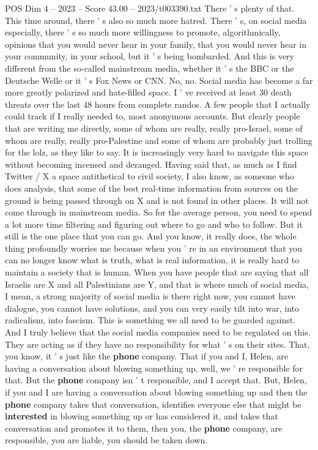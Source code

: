 \begin{textsample}{POS Dim 4 – 2023 – Score 43.00 – 2023/t003390.txt}
There ' s plenty of that.
This time around, there ' s also so much more hatred.
There ' s, on social media especially, there ' s so much more willingness to promote, algorithmically, opinions that you would never hear in your family, that you would never hear in your community, in your school, but it ' s being bombarded.
And this is very different from the so-called mainstream media, whether it ' s the BBC or the Deutsche Welle or it ' s Fox News or CNN.
No, no.
Social media has become a far more greatly polarized and hate-filled space.
I ' ve received at least 30 death threats over the last 48 hours from complete randos.
A few people that I actually could track if I really needed to, most anonymous accounts.
But clearly people that are writing me directly, some of whom are really, really pro-Israel, some of whom are really, really pro-Palestine and some of whom are probably just trolling for the lolz, as they like to say.
It is increasingly very hard to navigate this space without becoming incensed and deranged.
Having said that, as much as I find Twitter / X a space antithetical to civil society, I also know, as someone who does analysis, that some of the best real-time information from sources on the ground is being passed through on X and is not found in other places.
It will not come through in mainstream media.
So for the average person, you need to spend a lot more time filtering and figuring out where to go and who to follow.
But it still is the one place that you can go.
And you know, it really does, the whole thing profoundly worries me because when you ' re in an environment that you can no longer know what is truth, what is real information, it is really hard to maintain a society that is human.
When you have people that are saying that all Israelis are X and all Palestinians are Y, and that is where much of social media, I mean, a strong majority of social media is there right now, you cannot have dialogue, you cannot have solutions, and you can very easily tilt into war, into radicalism, into fascism.
This is something we all need to be guarded against.
And I truly believe that the social media companies need to be regulated on this.
They are acting as if they have no responsibility for what ' s on their sites.
That, you know, it ' s just like the \textbf{phone} company.
That if you and I, Helen, are having a conversation about blowing something up, well, we ' re responsible for that.
But the \textbf{phone} company isn ' t responsible, and I accept that.
But, Helen, if you and I are having a conversation about blowing something up and then the \textbf{phone} company takes that conversation, identifies everyone else that might be \textbf{interested} in blowing something up or has considered it, and takes that conversation and promotes it to them, then you, the \textbf{phone} company, are responsible, you are liable, you should be taken down.

\end{textsample}

